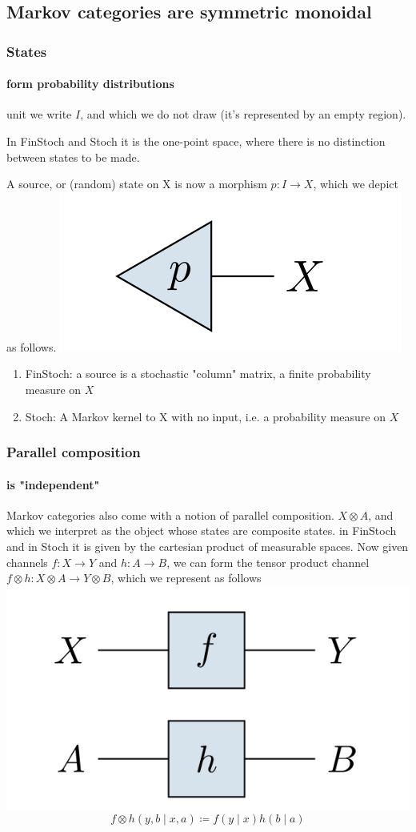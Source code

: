 \subsection{Markov categories are symmetric monoidal}
\begin{frame}
    \frametitle{States}
    \framesubtitle{form probability distributions}
unit we write $I$, and which we do not draw (it’s represented by an empty region). 

In FinStoch and Stoch it is the one-point space, where there is no distinction between states to be made.

A source, or (random) state on X is now a morphism $p: I\to X$, which we depict as follows.
\includegraphics[width=.4\textwidth]{graphics/string/markov_state.png}

\begin{enumerate}
    \item FinStoch: a source is a stochastic "column" matrix, a finite probability measure on $X$
    \item Stoch: A Markov kernel to X with no input, i.e. a probability measure on $X$
\end{enumerate}

\end{frame}

\begin{frame}
    \frametitle{Parallel composition} 
    \framesubtitle{is "independent"}
Markov categories also come with a notion of parallel composition. $X\otimes A$, and which we interpret as the object whose states are composite states. in FinStoch and in Stoch it is given by the cartesian product of measurable spaces. Now given channels $f: X\to Y$ and $h: A\to B$, we can form the tensor product channel $f\otimes h: X\otimes A\to Y\otimes B$, which we represent as follows
\includegraphics[width=.4\textwidth]{graphics/string/markov_parallel.png}
\[
    f\otimes h(y, b\mid x, a)\coloneqq f(y\mid x)h(b\mid a)
\]
\end{frame}

